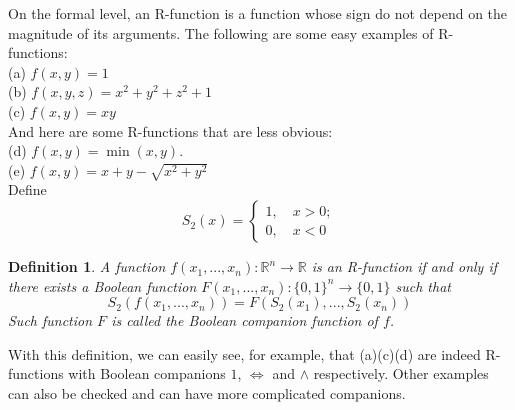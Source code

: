 \documentclass[11pt]{amsart}
\newtheorem{definition}{Definition}%
\theoremstyle{definition}
\begin{document}
On the formal level, an R-function is a function whose sign do not depend on the magnitude of its arguments.  The following are some easy  examples of R-functions: \\
(a) $f(x,y)=1$\\
(b) $f(x,y,z)=x^2+y^2+z^2+1$\\
(c) $f(x,y)=xy$\\
And here are some R-functions that are less obvious:\\
(d) $f(x,y)=\min(x,y)$. \\
(e) $f(x,y)=x+y-\sqrt{x^2+y^2}$\\
Define 
$$S_2(x)=\begin{cases} 1,\quad x>0;\\ 0, \quad x<0\end{cases}$$
\begin{definition}
A function $f(x_1,...,x_n):\mathbb{R}^n\to\mathbb{R}$ is an R-function if and only if there exists a Boolean function $F(x_1,...,x_n):\{0,1\}^n\to \{0,1\}$ such that
$$S_2(f(x_1,...,x_n))=F(S_2(x_1),...,S_2(x_n))$$
Such function $F$ is called the Boolean companion function of $f$.
\end{definition}

With this definition, we can easily see, for example,   that (a)(c)(d) are
indeed R-functions with Boolean companions $1$, $\Leftrightarrow$ and $\wedge$
respectively. Other examples can also be checked and can have more complicated
companions. 
\end{document}
